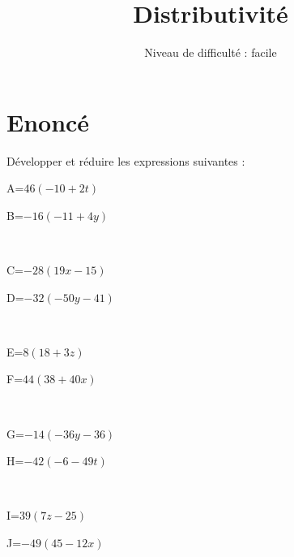 \documentclass{article}%
\title{Distributivité}%
\author{Niveau de difficulté : facile}%
\date{{}}%
\begin{document}
%
\normalsize%
\pagestyle{empty}%
\maketitle%
\section{Enoncé}%
\label{sec:Enonc}%
Développer et réduire les expressions suivantes :%
\newline%
%
\newline%
%
\begin{minipage}{0.5\textwidth}%
A=$46(-10+2t)$\\%
\end{minipage}%
\begin{minipage}{0.5\textwidth}%
B=$-16(-11+4y)$\\%
\end{minipage}%
\\%
\begin{minipage}{0.5\textwidth}%
C=$-28(19x-15)$\\%
\end{minipage}%
\begin{minipage}{0.5\textwidth}%
D=$-32(-50y-41)$\\%
\end{minipage}%
\\%
\begin{minipage}{0.5\textwidth}%
E=$8(18+3z)$\\%
\end{minipage}%
\begin{minipage}{0.5\textwidth}%
F=$44(38+40x)$\\%
\end{minipage}%
\\%
\begin{minipage}{0.5\textwidth}%
G=$-14(-36y-36)$\\%
\end{minipage}%
\begin{minipage}{0.5\textwidth}%
H=$-42(-6-49t)$\\%
\end{minipage}%
\\%
\begin{minipage}{0.5\textwidth}%
I=$39(7z-25)$\\%
\end{minipage}%
\begin{minipage}{0.5\textwidth}%
J=$-49(45-12x)$\\%
\end{minipage}%
\end{document}
